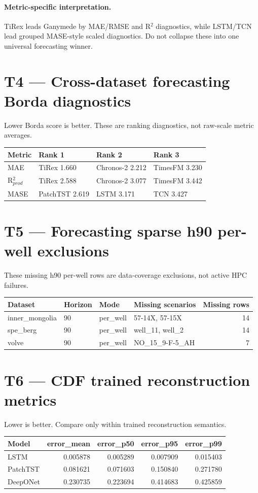 \documentclass[11pt]{article}
\begin{document}
\paragraph{Metric-specific interpretation.} TiRex leads Ganymede by MAE/RMSE and R$^2$ diagnostics, while LSTM/TCN lead grouped MASE-style scaled diagnostics. Do not collapse these into one universal forecasting winner.

\section*{T4 --- Cross-dataset forecasting Borda diagnostics}
Lower Borda score is better. These are ranking diagnostics, not raw-scale metric averages.

\begin{tabular}{llll}
\toprule
Metric & Rank 1 & Rank 2 & Rank 3 \\
\midrule
MAE & TiRex 1.660 & Chronos-2 2.212 & TimesFM 3.230 \\
R$^2_{prod}$ & TiRex 2.588 & Chronos-2 3.077 & TimesFM 3.442 \\
MASE & PatchTST 2.619 & LSTM 3.171 & TCN 3.427 \\
\bottomrule
\end{tabular}

\section*{T5 --- Forecasting sparse h90 per-well exclusions}
These missing h90 per-well rows are data-coverage exclusions, not active HPC failures.

\begin{tabular}{llllr}
\toprule
Dataset & Horizon & Mode & Missing scenarios & Missing rows \\
\midrule
inner\_mongolia & 90 & per\_well & 57-14X, 57-15X & 14 \\
spe\_berg & 90 & per\_well & well\_11, well\_2 & 14 \\
volve & 90 & per\_well & NO\_15\_9-F-5\_AH & 7 \\
\bottomrule
\end{tabular}

\section*{T6 --- CDF trained reconstruction metrics}
Lower is better. Compare only within trained reconstruction semantics.

\begin{tabular}{lrrrr}
\toprule
Model & error\_mean & error\_p50 & error\_p95 & error\_p99 \\
\midrule
LSTM & 0.005878 & 0.005289 & 0.007909 & 0.015403 \\
PatchTST & 0.081621 & 0.071603 & 0.150840 & 0.271780 \\
DeepONet & 0.230735 & 0.223694 & 0.414683 & 0.425859 \\
\bottomrule
\end{tabular}
\end{document}
